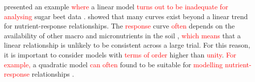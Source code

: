 \documentclass[a4paper]{article} 	%
\newcommand{\Matern}{Mat\'ern }
\newcommand{\AR}{\mathrm{AR1}}
\newcommand{\revision}[1]{\textcolor{red}{#1}}
\begin{document}
\textcite{Piepho2018Tutorial} presented an example \revision{where} a linear model \revision{turns out to be inadequate} \revision{for analysing} sugar beet data \parencite{Petersen1994Agricultural}. \textcite{Glynn2007} showed that many curves exist beyond a linear trend for nutrient-response relationships. The \revision{response} curve \revision{often} depends on the availability of other macro and micronutrients in the soil \parencite{Marschner2011}, \revision{which means } that a linear relationship is unlikely to be consistent across a large trial. For this reason, it is important to consider models with \revision{terms of order} higher than \revision{unity}. \revision{For example,} a quadratic model \revision{can often} found to be suitable for \revision{modelling nutrient-response} relationships \parencite{Piepho2018Tutorial, Liben2019}. 



% 



\end{document}

